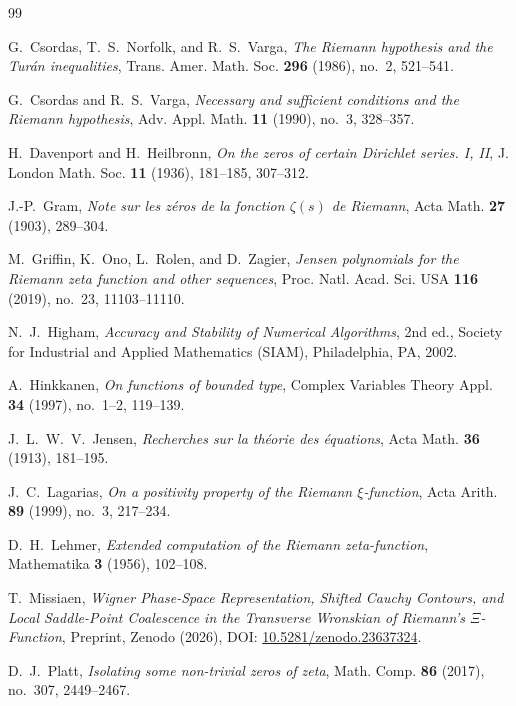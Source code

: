 \documentclass[11pt,a4paper,reqno]{amsart}
\theoremstyle{definition}
\theoremstyle{remark}
\numberwithin{equation}{section}
\begin{document}
\begin{thebibliography}{99}

G.~Csordas, T.~S.~Norfolk, and R.~S.~Varga, \emph{The Riemann hypothesis and the Tur\'an inequalities}, Trans. Amer. Math. Soc. \textbf{296} (1986), no.~2, 521--541.

G.~Csordas and R.~S.~Varga, \emph{Necessary and sufficient conditions and the Riemann hypothesis}, Adv. Appl. Math. \textbf{11} (1990), no.~3, 328--357.

H.~Davenport and H.~Heilbronn, \emph{On the zeros of certain Dirichlet series. I, II}, J. London Math. Soc. \textbf{11} (1936), 181--185, 307--312.

J.-P.~Gram, \emph{Note sur les z\'eros de la fonction $\zeta(s)$ de Riemann}, Acta Math. \textbf{27} (1903), 289--304.

M.~Griffin, K.~Ono, L.~Rolen, and D.~Zagier, \emph{Jensen polynomials for the Riemann zeta function and other sequences}, Proc. Natl. Acad. Sci. USA \textbf{116} (2019), no.~23, 11103--11110.

N.~J.~Higham, \emph{Accuracy and Stability of Numerical Algorithms}, 2nd ed., Society for Industrial and Applied Mathematics (SIAM), Philadelphia, PA, 2002.

A.~Hinkkanen, \emph{On functions of bounded type}, Complex Variables Theory Appl. \textbf{34} (1997), no.~1--2, 119--139.

J.~L.~W.~V.~Jensen, \emph{Recherches sur la th\'eorie des \'equations}, Acta Math. \textbf{36} (1913), 181--195.

J.~C.~Lagarias, \emph{On a positivity property of the Riemann $\xi$-function}, Acta Arith. \textbf{89} (1999), no.~3, 217--234.

D.~H.~Lehmer, \emph{Extended computation of the Riemann zeta-function}, Mathematika \textbf{3} (1956), 102--108.

T.~Missiaen, \emph{Wigner Phase-Space Representation, Shifted Cauchy Contours, and Local Saddle-Point Coalescence in the Transverse Wronskian of Riemann's $\Xi$-Function}, Preprint, Zenodo (2026), DOI: \href{https://doi.org/10.5281/zenodo.23637324}{10.5281/zenodo.23637324}.

D.~J.~Platt, \emph{Isolating some non-trivial zeros of zeta}, Math. Comp. \textbf{86} (2017), no.~307, 2449--2467.


\end{thebibliography}
\end{document}
